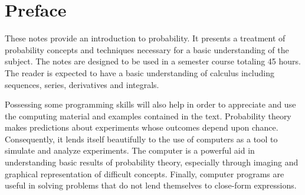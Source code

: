 \chapter{Preface}

These notes provide an introduction to probability.
It presents a treatment of probability concepts and techniques necessary for a basic understanding of the subject.
The notes are designed to be used in a semester course totaling 45 hours.
The reader is expected to have a basic understanding of calculus including sequences, series, derivatives and integrals.

Possessing some programming skills will also help in order to appreciate and use the computing material and examples contained in the text.
Probability theory makes predictions about experiments whose outcomes depend upon chance.
Consequently, it lends itself beautifully to the use of computers as a tool to simulate and analyze experiments.
The computer is a powerful aid in understanding basic results of probability theory, especially through imaging and graphical representation of difficult concepts.
Finally, computer programs are useful in solving problems that do not lend themselves to close-form expressions.

